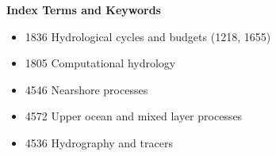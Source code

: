 \textbf{Index Terms and Keywords}

\begin{itemize}
\item 1836 Hydrological cycles and budgets (1218, 1655)
\item 1805 Computational hydrology
\item 4546 Nearshore processes
\item 4572 Upper ocean and mixed layer processes
\item 4536 Hydrography and tracers
\end{itemize}
  
  